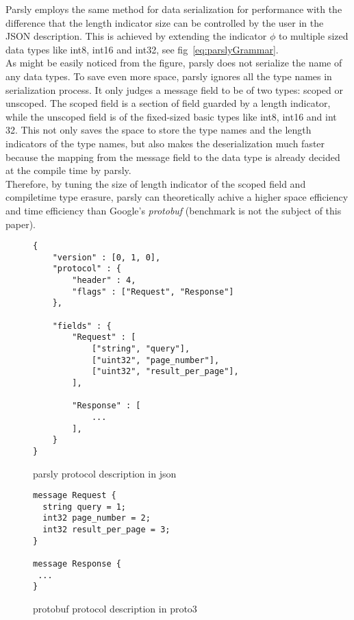 \documentclass{article}
\begin{document}
Parsly employs the same method for data serialization for performance with the difference that the length indicator size can be controlled by the user in the JSON description. This is achieved by extending the indicator $\phi$ to multiple sized data types like int8, int16 and int32, see fig~\ref{eq:parslyGrammar}. \\

As might be easily noticed from the figure, parsly does not serialize the name of any data types. To save even more space, parsly ignores all the type names in serialization process. It only judges a message field to be of two types: scoped or unscoped. The scoped field is a section of field guarded by a length indicator, while the unscoped field is of the fixed-sized basic types like int8, int16 and int 32. This not only saves the space to store the type names and the length indicators of the type names, but also makes the deserialization much faster because the mapping from the message field to the data type is already decided at the compile time by parsly.  \\

Therefore, by tuning the size of length indicator of the scoped field and compiletime type erasure, parsly can theoretically achive a higher space efficiency and time efficiency than Google's \textit{protobuf} (benchmark is not the subject of this paper). \\

\begin{figure}[h!]
\lstset{language=c++}
\begin{lstlisting}
{
	"version" : [0, 1, 0],
	"protocol" : {
		"header" : 4,
		"flags" : ["Request", "Response"]
	},

	"fields" : {
		"Request" : [
			["string", "query"],
			["uint32", "page_number"],
			["uint32", "result_per_page"],
		],
	
		"Response" : [
			...
		],
	}
}
\end{lstlisting}
\caption{parsly protocol description in json}
\label{lst:parslyJson}
\end{figure}

\begin{figure}[h!]
\lstset{language=c++, showlines=true}
\begin{lstlisting}
message Request {
  string query = 1;
  int32 page_number = 2;
  int32 result_per_page = 3;
}

message Response {
 ...
}
\end{lstlisting}
\caption{protobuf protocol description in proto3}
\label{lst:proto3}
\end{figure}
\end{document}
